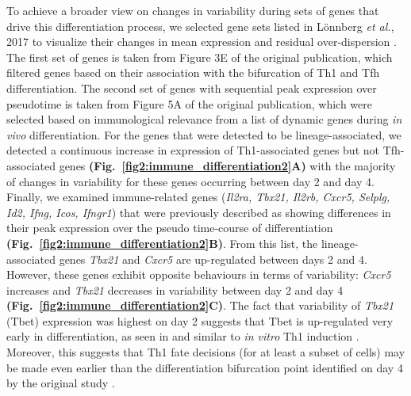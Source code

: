 To achieve a broader view on changes in variability during sets of genes that drive this differentiation process, we selected gene sets listed in L\"onnberg \emph{et al.}, 2017 to visualize their changes in mean expression and residual over-dispersion \citep{Lonnberg2017}. The first set of genes is taken from Figure 3E of the original publication, which filtered genes based on their association with the bifurcation of Th1 and Tfh differentiation. The second set of genes with sequential peak expression over pseudotime is taken from Figure 5A of the original publication, which were selected based on immunological relevance from a list of dynamic genes during \textit{in vivo} differentiation. For the genes that were detected to be lineage-associated, we detected a continuous increase in expression of Th1-associated genes but not Tfh-associated genes \textbf{(Fig.~\ref{fig2:immune_differentiation2}A)} with the majority of changes in variability for these genes occurring between day 2 and day 4. \\

Finally, we examined immune-related genes (\textit{Il2ra, Tbx21, Il2rb, Cxcr5, Selplg, Id2, Ifng, Icos, Ifngr1}) that were previously described as showing differences in their peak expression over the pseudo time-course of differentiation \citep{Lonnberg2017} \textbf{(Fig.~\ref{fig2:immune_differentiation2}B)}. From this list, the lineage-associated genes \textit{Tbx21} and \textit{Cxcr5} are up-regulated between days 2 and 4. However, these genes  exhibit opposite behaviours in terms of variability: \textit{Cxcr5} increases and \textit{Tbx21} decreases in variability between day 2 and day 4 \textbf{(Fig.~\ref{fig2:immune_differentiation2}C)}. The fact that variability of \textit{Tbx21} (Tbet) expression was highest on day 2 suggests that Tbet is up-regulated very early in differentiation, as seen in \cite{Lonnberg2017} and similar to \textit{in vitro} Th1 induction \citep{Szabo2000}. Moreover, this suggests that Th1 fate decisions (for at least a subset of cells) may be made even earlier than the differentiation bifurcation point identified on day 4 by the original study \citep{Lonnberg2017}. 

\newpage

